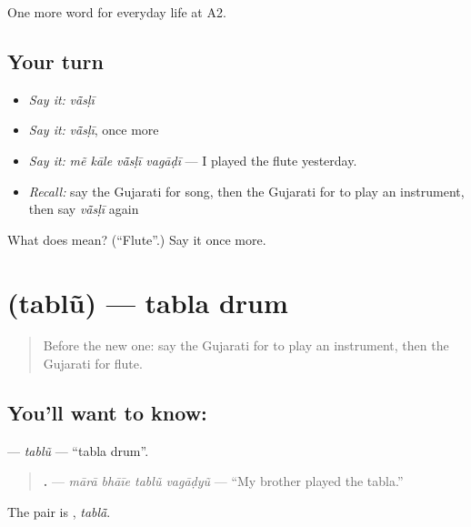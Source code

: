 \begin{grammarlens}[title={What you've built}]
One more word for everyday life at A2.
\end{grammarlens}

\subsection*{Your turn}
\begin{itemize}
\raggedright
  \item \emph{Say it:} \emph{vā̃sḷī}
  \item \emph{Say it:} \emph{vā̃sḷī}, once more
  \item \emph{Say it:} \emph{mẽ kāle vā̃sḷī vagāḍī} — I played the flute yesterday.
  \item \emph{Recall:} say the Gujarati for song, then the Gujarati for to play an instrument, then say \emph{vā̃sḷī} again
\end{itemize}

\begin{tcolorbox}[breakable,colback=teal!4,colframe=teal!35!black,title={Before you move on}]
What does  mean? (\textquotedblleft{}Flute\textquotedblright{}.) Say it once more.
\end{tcolorbox}
\section[\texorpdfstring{\gu{તબલું} (tablũ)}{તબલું (tablũ)}]{ (tablũ) — tabla drum}

\label{lesson:GU-C254-tablu}



\begin{quote}
Before the new one: say the Gujarati for to play an instrument, then the Gujarati for flute.
\end{quote}

\subsection*{You'll want to know: }
\textbf{} — \emph{tablũ} — \textquotedblleft{}tabla drum\textquotedblright{}.

\begin{quote}
\textbf{   .} — \emph{mārā bhāīe tablũ vagāḍyũ} — \textquotedblleft{}My brother played the tabla.\textquotedblright{}
\end{quote}

The pair is \textbf{}, \emph{tablā̃}.

